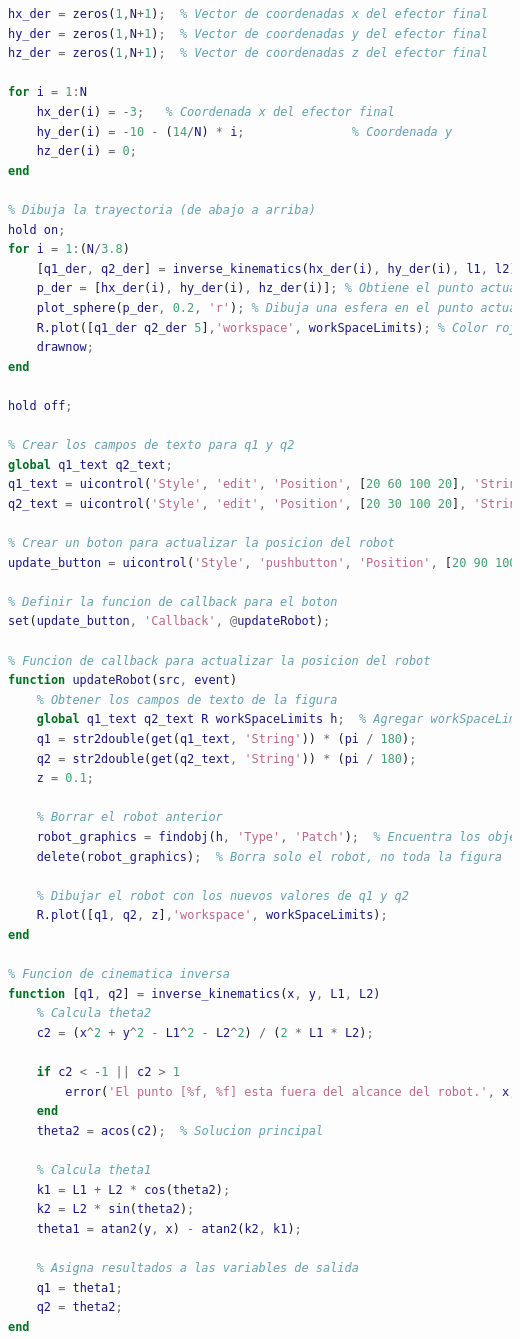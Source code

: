 \documentclass[final]{foresj}
\begin{document}
\begin{lstlisting}[language=Matlab]
% *Linea de abajo a arriba (color rojo)*
hx_der = zeros(1,N+1);  % Vector de coordenadas x del efector final
hy_der = zeros(1,N+1);  % Vector de coordenadas y del efector final
hz_der = zeros(1,N+1);  % Vector de coordenadas z del efector final

for i = 1:N
    hx_der(i) = -3;   % Coordenada x del efector final
    hy_der(i) = -10 - (14/N) * i;               % Coordenada y
    hz_der(i) = 0;
end

% Dibuja la trayectoria (de abajo a arriba)
hold on;
for i = 1:(N/3.8)
    [q1_der, q2_der] = inverse_kinematics(hx_der(i), hy_der(i), l1, l2); 
    p_der = [hx_der(i), hy_der(i), hz_der(i)]; % Obtiene el punto actual de la trayectoria
    plot_sphere(p_der, 0.2, 'r'); % Dibuja una esfera en el punto actual para visualizar la trayectoria (color rojo)
    R.plot([q1_der q2_der 5],'workspace', workSpaceLimits); % Color rojo
    drawnow;
end

hold off;

% Crear los campos de texto para q1 y q2
global q1_text q2_text;
q1_text = uicontrol('Style', 'edit', 'Position', [20 60 100 20], 'String', '0');
q2_text = uicontrol('Style', 'edit', 'Position', [20 30 100 20], 'String', '0');

% Crear un boton para actualizar la posicion del robot
update_button = uicontrol('Style', 'pushbutton', 'Position', [20 90 100 20], 'String', 'Actualizar');

% Definir la funcion de callback para el boton
set(update_button, 'Callback', @updateRobot);

% Funcion de callback para actualizar la posicion del robot
function updateRobot(src, event)
    % Obtener los campos de texto de la figura
    global q1_text q2_text R workSpaceLimits h;  % Agregar workSpaceLimits y h a la lista de variables globales
    q1 = str2double(get(q1_text, 'String')) * (pi / 180);
    q2 = str2double(get(q2_text, 'String')) * (pi / 180);
    z = 0.1;

    % Borrar el robot anterior
    robot_graphics = findobj(h, 'Type', 'Patch');  % Encuentra los objetos graficos que representan al robot
    delete(robot_graphics);  % Borra solo el robot, no toda la figura

    % Dibujar el robot con los nuevos valores de q1 y q2
    R.plot([q1, q2, z],'workspace', workSpaceLimits);
end

% Funcion de cinematica inversa
function [q1, q2] = inverse_kinematics(x, y, L1, L2)
    % Calcula theta2
    c2 = (x^2 + y^2 - L1^2 - L2^2) / (2 * L1 * L2);

    if c2 < -1 || c2 > 1
        error('El punto [%f, %f] esta fuera del alcance del robot.', x, y);
    end
    theta2 = acos(c2);  % Solucion principal

    % Calcula theta1
    k1 = L1 + L2 * cos(theta2);
    k2 = L2 * sin(theta2);
    theta1 = atan2(y, x) - atan2(k2, k1);

    % Asigna resultados a las variables de salida
    q1 = theta1;
    q2 = theta2;
end
\end{lstlisting}
\end{document}
